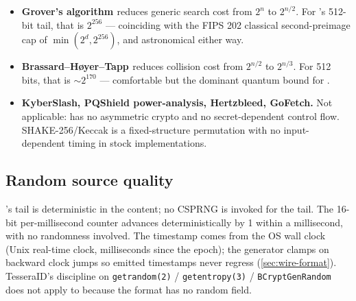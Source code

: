 \begin{itemize}
  \item \textbf{Grover's algorithm \citep{grover1996}} reduces generic search cost from $2^n$ to $2^{n/2}$. For \tesserahash{}'s 512-bit tail, that is $2^{256}$ --- coinciding with the FIPS 202 classical second-preimage cap of $\min(2^{d}, 2^{256})$, and astronomical either way.
  \item \textbf{Brassard--H{\o}yer--Tapp \citep{bht1998}} reduces collision cost from $2^{n/2}$ to $2^{n/3}$. For 512 bits, that is $\sim 2^{170}$ --- comfortable but the dominant quantum bound for \tesserahash{}.
  \item \textbf{KyberSlash, PQShield power-analysis, Hertzbleed, GoFetch.} Not applicable: \tesserahash{} has no asymmetric crypto and no secret-dependent control flow. SHAKE-256/Keccak is a fixed-structure permutation \citep{fips202} with no input-dependent timing in stock implementations.
\end{itemize}

\subsection{Random source quality}

\tesserahash{}'s tail is deterministic in the content; no CSPRNG is invoked for the tail. The 16-bit per-millisecond counter advances deterministically by 1 within a millisecond, with no randomness involved. The timestamp comes from the OS wall clock (Unix real-time clock, milliseconds since the epoch); the generator clamps on backward clock jumps so emitted timestamps never regress (\cref{sec:wire-format}). TesseraID's discipline on \texttt{getrandom(2)} / \texttt{getentropy(3)} / \texttt{BCryptGenRandom} does not apply to \tesserahash{} because the format has no random field.
